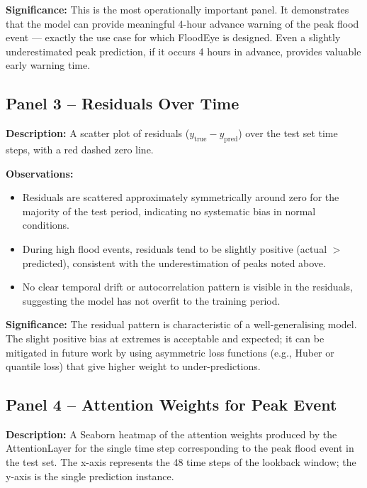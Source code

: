 \textbf{Significance:} This is the most operationally important panel. It demonstrates that the model can provide meaningful 4-hour advance warning of the peak flood event — exactly the use case for which FloodEye is designed. Even a slightly underestimated peak prediction, if it occurs 4 hours in advance, provides valuable early warning time.

\subsection{Panel 3 -- Residuals Over Time}

\textbf{Description:} A scatter plot of residuals ($y_{\text{true}} - y_{\text{pred}}$) over the test set time steps, with a red dashed zero line.

\textbf{Observations:}
\begin{itemize}[leftmargin=1.5em]
  \item Residuals are scattered approximately symmetrically around zero for the majority of the test period, indicating no systematic bias in normal conditions.
  \item During high flood events, residuals tend to be slightly positive (actual $>$ predicted), consistent with the underestimation of peaks noted above.
  \item No clear temporal drift or autocorrelation pattern is visible in the residuals, suggesting the model has not overfit to the training period.
\end{itemize}

\textbf{Significance:} The residual pattern is characteristic of a well-generalising model. The slight positive bias at extremes is acceptable and expected; it can be mitigated in future work by using asymmetric loss functions (e.g., Huber or quantile loss) that give higher weight to under-predictions.

\subsection{Panel 4 -- Attention Weights for Peak Event}

\textbf{Description:} A Seaborn heatmap of the attention weights produced by the AttentionLayer for the single time step corresponding to the peak flood event in the test set. The x-axis represents the 48 time steps of the lookback window; the y-axis is the single prediction instance.

